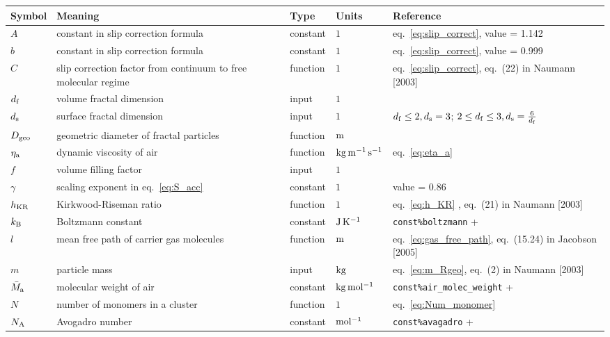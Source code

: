 \documentclass{article}
\begin{document}
\newcommand{\rr}{\raggedright}
\newcommand{\tn}{\tabularnewline\hline}
\renewcommand{\arraystretch}{1.5}


\begin{longtable}{|l|p{5.5cm}|l|l|p{4.5cm}|}
\hline \textbf{Symbol} & \textbf{Meaning}                                                       & \textbf{Type} & \textbf{Units}                        &  \textbf{Reference}                                \tn
\hline \endhead
$A$					   & \rr constant in slip correction formula								& constant			& $1$									& \rr eq.~\ref{eq:slip_correct}, value = 1.142		 \tn
$b$					   & \rr constant in slip correction formula								& constant			& $1$									& \rr eq.~\ref{eq:slip_correct}, value = 0.999		 \tn
$C$					   & \rr slip correction factor from continuum to free molecular regime		& function		& $1$									& \rr eq.~\ref{eq:slip_correct}, eq.~(22) in Naumann [2003]					 \tn
$d_{\rm f}$			   & \rr volume fractal dimension											& input			& $1$									& \rr 				 \tn
$d_{\rm s}$			   & \rr surface fractal dimension											& input			& $1$									& \rr $d_{\rm f} \leq 2, d_{\rm s} = 3$; $2 \leq d_{\rm f} \leq 3, d_{\rm s} = \frac{6}{d_{\rm f}}$				 \tn
$D_{\rm geo}$		   & \rr geometric diameter of fractal particles								& function		& $\rm m$								& 							 \tn
$\eta_{\rm a}$		   & \rr dynamic viscosity of air											& function		& $\rm kg \, m^{-1} \, s^{-1}$			& \rr eq.~\ref{eq:eta_a}							 \tn
$f$					   & \rr volume filling factor												& input			& $1$									& \rr 					 \tn
$\gamma$			   & \rr scaling exponent in eq.~\ref{eq:S_acc} 	 							& constant			& $1$									& \rr value = 0.86									 \tn
$h_{\rm KR}$		   & \rr Kirkwood-Riseman ratio												& function		& $1$									& \rr eq.~\ref{eq:h_KR}	, eq.~(21) in Naumann [2003] 					 \tn
$k_{\rm B}$			   & \rr Boltzmann constant													& constant		& $\rm J \, K^{-1}$	& \rr \verb+const%boltzmann+ 		 		 \tn
$l$					   & \rr mean free path of carrier gas molecules							& function			& $\rm m$								& \rr 	eq.~\ref{eq:gas_free_path}, eq.~(15.24) in Jacobson [2005]	 \tn
$m$					   & \rr particle mass														& input			& $\rm kg$								& \rr eq.~\ref{eq:m_Rgeo}, eq.~(2) in Naumann [2003] 					 \tn
$\bar{M}_{\rm a}$	   & \rr molecular weight of air											& constant		& $\rm kg \, mol^{-1}$					& \rr \verb+const%air_molec_weight+		 \tn
$N$					   & \rr number of monomers in a cluster									& function		& $1$									& \rr eq.~\ref{eq:Num_monomer}	 					 \tn
$N_{\rm A}$			   & \rr Avogadro number													& constant		& $\rm mol^{-1}$						& \rr \verb+const%avagadro+ 				 		 \tn

\end{longtable}
\end{document}
